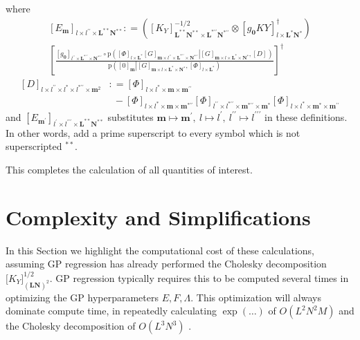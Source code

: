 \documentclass[preprint,12pt]{elsarticle}
\newcommand*{\M}[1]{\ensuremath{#1}\xspace}
\newcommand*{\x}{\times}
\newcommand*{\mi}[1]{\mathbf{#1}}
\newcommand*{\te}[2][]{\left\lbrack{#2}\right\rbrack_{#1}}
\newcommand*{\tte}[2][]{\lbrack{#2}\rbrack_{#1}}
\newcommand*{\prob}[3]{\M{\mathrm{p}\!\left(\left.{#1}\right\vert{#2,#3}\right)}}
\newcommand*{\deq}{\M{\mathrel{\mathop:}=}}
\begin{document}
        where
        \begin{multline*}
            \te[l\x l^{\prime\prime}\x \mi{L^{**}N^{**}}]{E_{\mi{m}}} \deq 
            \left(
                \te[\mi{L^{**}N^{**}}\x\mi{L^{*\prime\prime}N^{*\prime\prime}}]{K_{Y}}^{-1/2} \otimes \te[l\x\mi{L^{*}N^{*}}]{g_{\mi{0}}KY}^{\dagger} \right) \\
            \left\lbrack\frac{
            \te[l^{\prime\prime}\x\mi{L^{*\prime\prime}}\x\mi{N^{*\prime\prime}}]{g_{\mi{0}}} \circ
            \prob
            {\te[l\x \mi{L^{*}}]{\Phi} 
            \te[\mi{m}\x l^{\prime\prime}\x \mi{L^{*\prime\prime}\x N^{*\prime\prime}}]{G}}
            {\te[\mi{m}\x l\x \mi{L^{*}\x N^{*}}]{G}}
            {\te[]{D}}}
            {\prob{\te[\mi{m}]{0}}{\te[\mi{m}\x l\x \mi{L^{*}\x N^{*}}]{G}}{\te[l\x \mi{L^{*}}]{\Phi}}} \right\rbrack^{\dagger}
        \end{multline*}
        \begin{equation*}
            \begin{aligned}
                \te[l\x l^{\prime\prime} \x l^{*}\x l^{*\prime\prime}\x\mi{m}^{2}]{D} &\deq \te[l\x l^{*}\x\mi{m}\x\mi{m^{\prime\prime}}]{\Phi} \\ 
                &\phantom{:} - \te[l\x l^{*}\x\mi{m}\x\mi{m^{*\prime\prime}}]{\Phi}
                \te[l^{\prime\prime}\x l^{*\prime\prime}\x\mi{m^{*\prime\prime}}\x\mi{m^{*}}]{\Phi}
                \te[l\x l^{*}\x\mi{m^{*}}\x\mi{m^{\prime\prime}}]{\Phi}
            \end{aligned}
        \end{equation*}
        and $\te[l^{\prime}\x l^{\prime\prime\prime}\x \mi{L^{**}N^{**}}]{E_{\mi{m^{\prime}}}}$ substitutes $\mi{m}\mapsto\mi{m^{\prime}},\ l\mapsto l^{\prime},\ l^{\prime\prime}\mapsto l^{\prime\prime\prime}$ in these definitions. In other words, add a prime superscript to every symbol which is not superscripted $^{**}$.

        This completes the calculation of all quantities of interest.

\section{Complexity and Simplifications}\label{sec:Complexity}
    In this Section we highlight the computational cost of these calculations, assuming GP regression has already performed the Cholesky decomposition $\tte[\mi{(LN)}^{2}]{K_{Y}}^{1/2}$. GP regression typically requires this to be computed several times in optimizing the GP hyperparameters $E, F, \Lambda$. This optimization will always dominate compute time, in repeatedly calculating $\exp(\ldots)$ of $O(L^{2}N^{2}M)$ and the Cholesky decomposition of $O(L^{3}N^{3})$ \cite{Dai2022}. 
    
\end{document}
